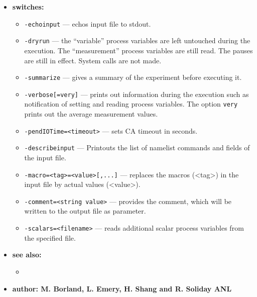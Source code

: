 \begin{itemize}
\item {\bf switches:}
%
%
    \begin{itemize}
    \item {\verb+-echoinput+} --- echos input file to stdout.
    \item {\verb+-dryrun+} --- the ``variable'' process variables are left untouched during the execution. The ``measurement''
                process variables are still read. The pauses are still in effect. System calls are not made.
    \item {\verb+-summarize+} --- gives a summary of the experiment before executing it.
    \item {\verb+-verbose[=very]+} --- prints out information during the execution such as notification of 
                setting and reading process variables. The option \verb+very+ prints out the average measurement values.
    \item {\verb+-pendIOTime=<timeout>+} --- sets CA timeout in seconds.
    \item {\verb+-describeinput+} --- Printouts the list of namelist commands and fields of the input file.
    \item {\verb+-macro=<tag>=<value>[,...]+} --- replaces the macros (<tag>) in the input file by actual values (<value>).
    \item {\verb+-comment=<string value>+} --- provides the comment, which will be written to the output file as parameter.
    \item {\verb+-scalars=<filename>+} --- reads additional scalar process variables from the specified file.
    \end{itemize}

\item {\bf see also:}
    \begin{itemize}
%
%
    \item {}
    \end{itemize}
%
%
\item {\bf author: M. Borland, L. Emery, H. Shang and R. Soliday ANL} 
\end{itemize}
